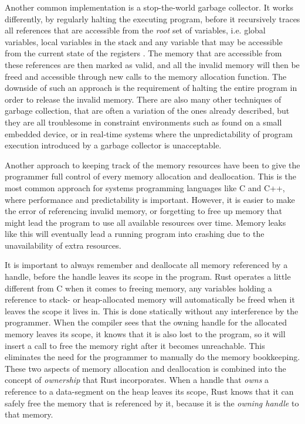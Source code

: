 Another common implementation is a stop-the-world garbage collector.
It works differently, by regularly halting the executing program, before it recursively traces all references that are accessible from the \emph{root} set of variables, i.e. global variables, local variables in the stack and any variable that may be accessible from the current state of the registers \cite{Wilson1992}.
The memory that are accessible from these references are then marked as valid, and all the invalid memory will then be freed and accessible through new calls to the memory allocation function.
The downside of such an approach is the requirement of halting the entire program in order to release the invalid memory.
There are also many other techniques of garbage collection, that are often a variation of the ones already described, but they are all troublesome in constraint environments such as found on a small embedded device, or in real-time systems where the unpredictability of program execution introduced by a garbage collector is unacceptable.

Another approach to keeping track of the memory resources have been to give the programmer full control of every memory allocation and deallocation.
This is the most common approach for systems programming languages like C and C++, where performance and predictability is important.
However, it is easier to make the error of referencing invalid memory, or forgetting to free up memory that might lead the program to use all available resources over time.
Memory leaks like this will eventually lead a running program into crashing due to the unavailability of extra resources.


It is important to always remember and deallocate all memory referenced by a handle, before the handle leaves its scope in the program.
Rust operates a little different from C when it comes to freeing memory, any variables holding a reference to stack- or heap-allocated memory will automatically be freed when it leaves the scope it lives in.
This is done statically without any interference by the programmer.
When the compiler sees that the owning handle for the allocated memory leaves its scope, it knows that it is also lost to the program, so it will insert a call to free the memory right after it becomes unreachable.
This eliminates the need for the programmer to manually do the memory bookkeeping.
These two aspects of memory allocation and deallocation is combined into the concept of \emph{ownership} that Rust incorporates.
When a handle that \emph{owns} a reference to a data-segment on the heap leaves its scope, Rust knows that it can safely free the memory that is referenced by it, because it is the \emph{owning handle} to that memory.

